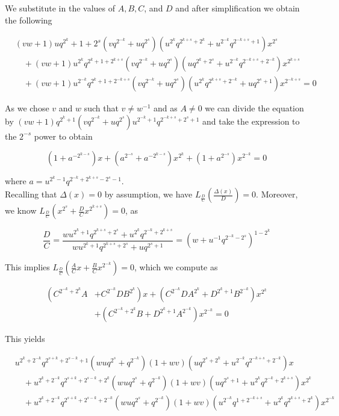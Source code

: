 \documentclass[10pt]{article}
\begin{document}
We substitute in the values of $A, B, C$, and $D$ and after simplification we obtain the following

$$
\begin{aligned}
& (v w+1) u q^{2^{k}}+1+2^{s}\left(v q^{2^{-k}}+u q^{2^{s}}\right)\left(u^{2^{k}} q^{2^{k+s}+2^{k}}+u^{2^{-k}} q^{2^{-k+s}+1}\right) x^{2^{s}} \\
& \quad+(v w+1) u^{2^{k}} q^{2^{k}+1+2^{k+s}}\left(v q^{2^{-k}}+u q^{2^{s}}\right)\left(u q^{2^{k}+2^{s}}+u^{2^{-k}} q^{2^{-k+s}+2^{-k}}\right) x^{2^{k+s}} \\
& \quad+(v w+1) u^{2^{-k}} q^{2^{k}+1+2^{-k+s}}\left(v q^{2^{-k}}+u q^{2^{s}}\right)\left(u^{2^{k}} q^{2^{k+s}+2^{-k}}+u q^{2^{s}+1}\right) x^{2^{-k+s}}=0
\end{aligned}
$$

As we chose $v$ and $w$ such that $v \neq w^{-1}$ and as $A \neq 0$ we can divide the equation by $(v w+1) q^{2^{k}+1}\left(v q^{2^{-k}}+u q^{2^{s}}\right) u^{2^{-k}+1} q^{2^{-k+s}+2^{s}+1}$ and take the expression to the $2^{-s}$ power to obtain


\begin{equation*}
\left(1+a^{-2^{k-s}}\right) x+\left(a^{2^{-s}}+a^{-2^{k-s}}\right) x^{2^{k}}+\left(1+a^{2^{-s}}\right) x^{2^{-k}}=0 \tag{2}
\end{equation*}


where $a=u^{2^{k}-1} q^{2^{-k}+2^{k+s}-2^{s}-1}$.\\
Recalling that $\Delta(x)=0$ by assumption, we have $L_{\frac{D}{C}}\left(\frac{\Delta(x)}{D}\right)=0$. Moreover, we know $L_{\frac{D}{C}}\left(x^{2^{s}}+\frac{D}{C} x^{2^{k+s}}\right)=0$, as

$$
\frac{D}{C}=\frac{w u^{2^{k}+1} q^{2^{k+s}+2^{s}}+u^{2^{k}} q^{2^{-k}+2^{k+s}}}{w u^{2^{k}+1} q^{2^{k+s}+2^{s}}+u q^{2^{s}+1}}=\left(w+u^{-1} q^{2^{-k}-2^{s}}\right)^{1-2^{k}}
$$

This implies $L_{\frac{D}{C}}\left(\frac{A}{C} x+\frac{B}{C} x^{2^{-k}}\right)=0$, which we compute as

$$
\begin{aligned}
\left(C^{2^{-k}+2^{k}} A\right. & \left.+C^{2^{-k}} D B^{2^{k}}\right) x+\left(C^{2^{-k}} D A^{2^{k}}+D^{2^{k}+1} B^{2^{-k}}\right) x^{2^{k}} \\
& +\left(C^{2^{-k}+2^{k}} B+D^{2^{k}+1} A^{2^{-k}}\right) x^{2^{-k}}=0
\end{aligned}
$$

This yields

$$
\begin{aligned}
& u^{2^{k}+2^{-k}} q^{2^{s+k}+2^{s-k}+1}\left(w u q^{2^{s}}+q^{2^{-k}}\right)(1+w v)\left(u q^{2^{s}+2^{k}}+u^{2^{-k}} q^{2^{-k+s}+2^{-k}}\right) x \\
& \quad+u^{2^{k}+2^{-k}} q^{2^{s+k}+2^{s-k}+2^{k}}\left(w u q^{2^{s}}+q^{2^{-k}}\right)(1+w v)\left(u q^{2^{s}+1}+u^{2^{k}} q^{2^{-k}+2^{k+s}}\right) x^{2^{k}} \\
& \quad+u^{2^{k}+2^{-k}} q^{2^{s+k}+2^{s-k}+2^{-k}}\left(w u q^{2^{s}}+q^{2^{-k}}\right)(1+w v)\left(u^{2^{-k}} q^{1+2^{-k+s}}+u^{2^{k}} q^{2^{k+s}+2^{k}}\right) x^{2^{-k}}
\end{aligned}
$$
\end{document}
